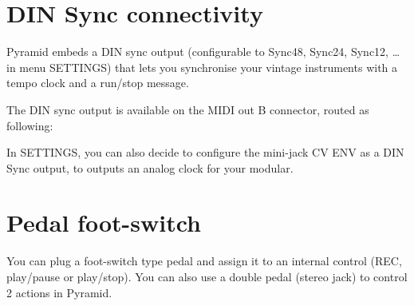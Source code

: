 \section{DIN Sync connectivity}


Pyramid embeds a DIN sync output (configurable to Sync48, Sync24, Sync12, \ldots in menu SETTINGS) that lets you synchronise your vintage instruments with a tempo clock and a run/stop message.

The DIN sync output is available on the MIDI out B connector, routed as following:


In SETTINGS, you can also decide to configure the mini-jack CV ENV as a DIN Sync output, to outputs an analog clock for your modular.


\section{Pedal foot-switch}


You can plug a foot-switch type pedal and assign it to an internal control (REC, play/pause or play/stop). You can also use a double pedal (stereo jack) to control 2 actions in Pyramid.
